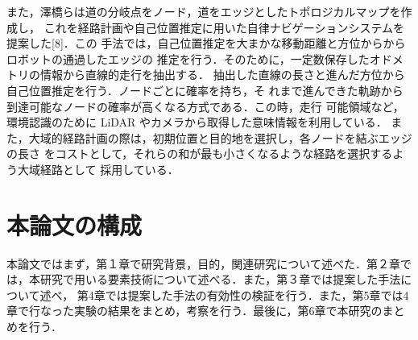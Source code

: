 \documentclass[../main]{subfiles}
\begin{document}
        また，澤橋らは道の分岐点をノード，道をエッジとしたトポロジカルマップを作成し，
        これを経路計画や自己位置推定に用いた自律ナビゲーションシステムを提案した[8]．この
        手法では，自己位置推定を大まかな移動距離と方位からからロボットの通過したエッジの
        推定を行う．そのために，一定数保存したオドメトリの情報から直線的走行を抽出する．
        抽出した直線の長さと進んだ方位から自己位置推定を行う．ノードごとに確率を持ち，そ
        れまで進んできた軌跡から到達可能なノードの確率が高くなる方式である．この時，走行
        可能領域など，環境認識のために LiDAR やカメラから取得した意味情報を利用している．
        また，大域的経路計画の際は，初期位置と目的地を選択し，各ノードを結ぶエッジの長さ
        をコストとして，それらの和が最も小さくなるような経路を選択するよう大域経路として
        採用している．

        \section{本論文の構成}
        本論文ではまず，第１章で研究背景，目的，関連研究について述べた．第２章では，本研究で用いる要素技術について述べる．また，第３章では提案した手法について述べ，
        第4章では提案した手法の有効性の検証を行う．また，第5章では4章で行なった実験の結果をまとめ，考察を行う．最後に，第6章で本研究のまとめを行う．
\end{document}
